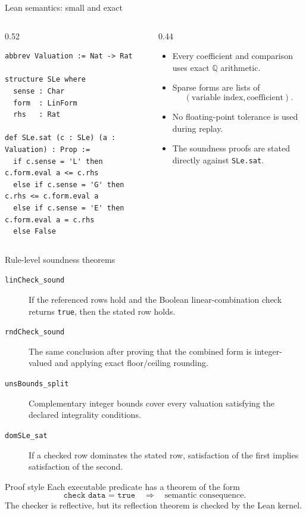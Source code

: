 \documentclass[aspectratio=169,11pt]{beamer}
\newcommand{\code}[1]{\texttt{#1}}
\begin{document}
\begin{frame}[fragile]{Lean semantics: small and exact}
  \begin{columns}[T]
    \begin{column}{0.52\textwidth}
\begin{lstlisting}
abbrev Valuation := Nat -> Rat

structure SLe where
  sense : Char
  form  : LinForm
  rhs   : Rat

def SLe.sat (c : SLe) (a : Valuation) : Prop :=
  if c.sense = 'L' then c.form.eval a <= c.rhs
  else if c.sense = 'G' then c.rhs <= c.form.eval a
  else if c.sense = 'E' then c.form.eval a = c.rhs
  else False
\end{lstlisting}
    \end{column}
    \begin{column}{0.44\textwidth}
      \begin{itemize}
        \item Every coefficient and comparison uses exact
              $\mathbb{Q}$ arithmetic.
        \item Sparse forms are lists of
              \[
                (\text{variable index},\text{coefficient}).
              \]
        \item No floating-point tolerance is used during replay.
        \item The soundness proofs are stated directly against
              \code{SLe.sat}.
      \end{itemize}
    \end{column}
  \end{columns}
\end{frame}

\begin{frame}{Rule-level soundness theorems}
  \small
  \begin{description}
    \item[\code{linCheck\_sound}]
      If the referenced rows hold and the Boolean linear-combination check returns
      \code{true}, then the stated row holds.

    \item[\code{rndCheck\_sound}]
      The same conclusion after proving that the combined form is integer-valued
      and applying exact floor/ceiling rounding.

    \item[\code{unsBounds\_split}]
      Complementary integer bounds cover every valuation satisfying the declared
      integrality conditions.

    \item[\code{domSLe\_sat}]
      If a checked row dominates the stated row, satisfaction of the first implies
      satisfaction of the second.
  \end{description}

  \begin{block}{Proof style}
    Each executable predicate has a theorem of the form
    \[
      \texttt{check data = true}\quad\Longrightarrow\quad
      \text{semantic consequence}.
    \]
    The checker is reflective, but its reflection theorem is checked by the Lean kernel.
  \end{block}
\end{frame}
\end{document}
